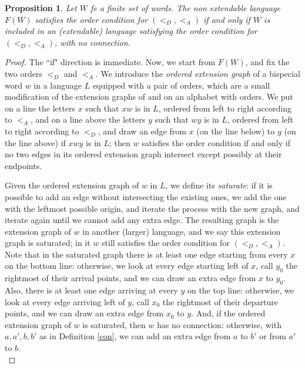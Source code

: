 \documentclass[12pt,a4paper]{amsart}
\newtheorem{proposition}[theorem]{Proposition}
\begin{document}
\begin{proposition}\label{pfl}
Let $W$ fe a finite set of words. The non extendable language $F(W)$ satisfies the order condition for  $(<_D,<_A)$ if and only if $W$ is included in an (extendable) language satisfying the order condition for $(<_D,<_A)$, with no connection.
\end{proposition}
\begin{proof}
The ``if" direction is immediate. Now, we start from  $F(W)$, and fix the two orders 
$<_D$ and $<_A$. We introduce the {\it ordered extension graph} of a bispecial word $w$ in a language $L$ equipped with a pair of orders, which are a small modification of the extension graphs of \cite{b+} and \cite{d} on an alphabet with orders. We put on a line the letters $x$ such that $xw$ is in $L$, ordered from left to right according to $<_A$, and on a line above the letters $y$ such that $wy$ is in $L$, ordered from left to right according to $<_D$, and draw  an edge from $x$ (on the line below)  to $y$ (on the line above) if $xwy$ is in $L$; then $w$ satisfies the order condition if and only if no two edges in its ordered extension graph intersect except possibly at their endpoints. 

Given the ordered extension graph of $w$ in $L$, we define its  {\em saturate}:  if it is possible to add an edge without intersecting the existing ones, we add the one with the leftmost possible origin, and iterate the process with 
the new graph, and iterate again until we cannot add any extra edge. The resulting graph is the extension graph of $w$ in another (larger) language, and we say this extension graph is saturated; in it $w$ still satisfies the order condition for $(<_D,<_A)$. Note that in the saturated graph there is at least one edge starting from every $x$ on the bottom line: otherwise, we look at every edge starting left of $x$, call $y_0$ the rightmost of their arrival points, 
and we can draw an extra edge from $x$ to $y_0$. Also, there is at least one edge arriving at every $y$ on the top line: otherwise, we look at every edge arriving left of $y$, call $x_0$ the rightmost of their departure points, 
and we can draw an extra edge from $x_0$ to $y$. And, if the ordered extension graph of $w$ is saturated, then $w$ has no  connection: otherwise, with $a,a',b,b'$ as in Definition \ref{con}, we can add an extra edge from $a$ to $b'$ or from $a'$ to $b$.\\




\end{proof}
\end{document}
